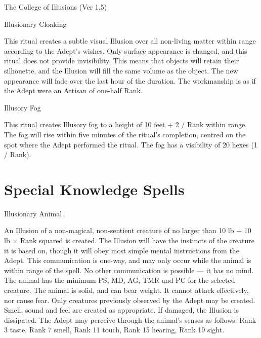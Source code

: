 \begin{Chapter}{The College of Illusions (Ver 1.5)}
\begin{ritual}[Q-1]{Illusionary Cloaking}
\begin{effects}
This ritual creates a subtle visual Illusion over all non-living
matter within range according to the Adept’s wishes.  Only surface
appearance is changed, and this ritual does not provide invisibility.
This means that objects will retain their silhouette, and the Illusion
will fill the same volume as the object.  The new appearance will fade
over the last hour of the duration. The workmanship is as if the Adept
were an Artisan of one-half Rank.
\end{effects}
\end{ritual}

\begin{ritual}[Q-2]{Illusory Fog}

\begin{effects}
This ritual creates Illusory fog to a height of 10 feet + 2 / Rank
within range.  The fog will rise within five minutes of the ritual’s
completion, centred on the spot where the Adept performed the ritual.
The fog has a visibility of 20 hexes (1 / Rank).
\end{effects}
\end{ritual}

\section{Special Knowledge Spells}

\begin{spell}[S-1]{Illusionary Animal}

\begin{effects}
An Illusion of a non-magical, non-sentient creature of no larger than
10 lb + 10 lb × Rank squared is created.  The Illusion will have the
instincts of the creature it is based on, though it will obey most
simple mental instructions from the Adept.  This communication is
one-way, and may only occur while the animal is within range of the
spell. No other communication is possible — it has no mind.  The
animal has the minimum PS, MD, AG, TMR and PC for the selected
creature.  The animal is solid, and can bear weight.  It cannot attack
effectively, nor cause fear.  Only creatures previously observed by
the Adept may be created.  Smell, sound and feel are created as
appropriate. If damaged, the Illusion is dissipated. The Adept may
perceive through the animal’s senses as follows: Rank 3 taste, Rank 7
smell, Rank 11 touch, Rank 15 hearing, Rank 19 sight.
\end{effects}
\end{spell}


\end{Chapter}
